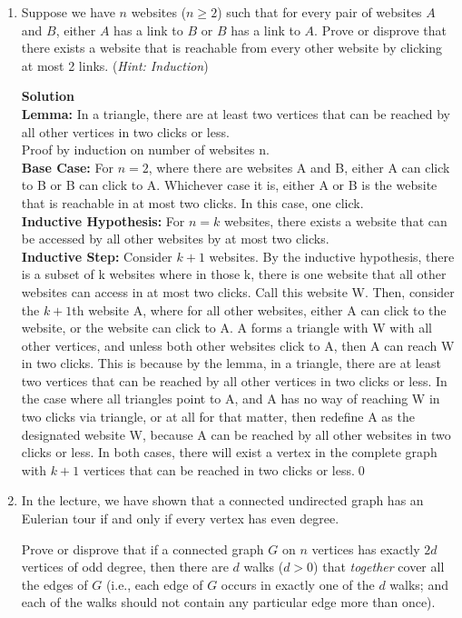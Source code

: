 \documentclass[11pt]{article}
\newenvironment{Parts}{\begin{enumerate}[label=(\alph*)]}{\end{enumerate}}
\newcommand*{\Part}{\item}
\begin{document}
\begin{Parts}
\Part  Suppose we have $n$ websites ($n \geq 2$) such that for every pair of websites $A$ and $B$,
either $A$ has a link to $B$ or $B$ has a link to $A$. Prove or disprove that
there exists a website that is reachable from every other website by clicking at
most 2 links. (\textit{Hint: Induction})

\begin{mdframed} \textbf{Solution} \\
\textbf{Lemma: }In a triangle, there are at least two vertices that can be reached by all other vertices in two clicks or less. \\
Proof by induction on number of websites n. \\
\textbf{Base Case: }For $n=2$, where there are websites A and B, either A can click to B or B can click to A. Whichever case it is, either A or B is the website that is reachable in at most two clicks. In this case, one click. \\
\textbf{Inductive Hypothesis: }For $n=k$ websites, there exists a website that can be accessed by all other websites by at most two clicks. \\
\textbf{Inductive Step: }Consider $k+1$ websites. By the inductive hypothesis, there is a subset of k websites where in those k, there is one website that all other websites can access in at most two clicks. Call this website W. Then, consider the $k+1$th website A, where for all other websites, either A can click to the website, or the website can click to A. A forms a triangle with W with all other vertices, and unless both other websites click to A, then A can reach W in two clicks. This is because by the lemma, in a triangle, there are at least two vertices that can be reached by all other vertices in two clicks or less. In the case where all triangles point to A, and A has no way of reaching W in two clicks via triangle, or at all for that matter, then redefine A as the designated website W, because A can be reached by all other websites in two clicks or less. In both cases, there will exist a vertex in the complete graph with $k+1$ vertices that can be reached in two clicks or less.\qed
\end{mdframed}

\pagebreak  

\Part  
In the lecture, we have shown that a connected undirected graph has an Eulerian tour if and only if every vertex has even degree.

Prove or disprove that if a connected graph $G$ on $n$ vertices has exactly $2d$ vertices of
odd degree, then there are $d$ walks ($d>0$) that \emph{together} cover all the edges of
$G$ (i.e., each edge of $G$ occurs in exactly one of the $d$ walks; and each of
the walks should not contain any particular edge more than once).


\end{Parts}
\end{document}
